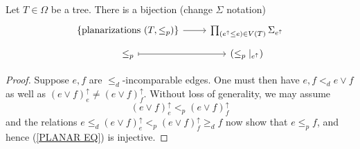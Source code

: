 \documentclass[a4paper,10pt]{article}%
\begin{document}
\begin{proposition}\label{PLANARIZATIONCHAR PROP}
	Let $T \in \Omega$ be a tree. There is a bijection {\color{green}(change $\Sigma$ notation)}
	\begin{equation}\label{PLANAR EQ}
	\begin{tikzcd}[row sep = 0.5em]
		\{\text{planarizations }(T,\leq_p)\} \ar[r] &
		\prod_{(e^{\uparrow} \leq e) \in V(T)} \Sigma_{e^{\uparrow}} \\
		\leq_p \ar[mapsto]{r} & (\leq_p|_{e^{\uparrow}})
	\end{tikzcd}	
	\end{equation}
\end{proposition}

\begin{proof}
	Suppose $e, f$ are $\leq_d$-incomparable edges. One must then have $e,f <_d  e \vee f$ as well as 
	$(e \vee f)^{\uparrow}_e \neq (e \vee f)^{\uparrow}_f$. Without loss of generality, we may assume 
	\begin{equation}\label{PLANARORDERDEF}
		(e \vee f)^{\uparrow}_e <_p (e \vee f)^{\uparrow}_f
	\end{equation}
and the relations 
$e \leq_d (e \vee f)^{\uparrow}_e <_p (e \vee f)^{\uparrow}_f \geq_d f$ now show that $e \leq_p f$, and hence (\ref{PLANAR EQ}) is injective.


\end{proof}
\end{document}
